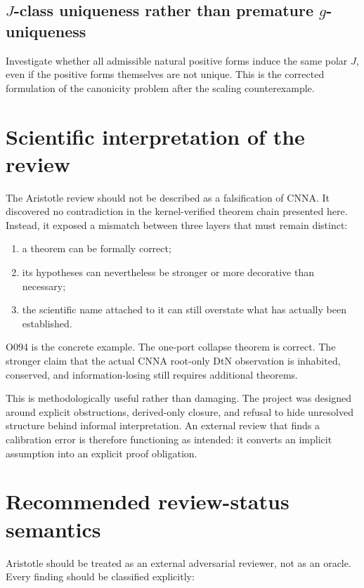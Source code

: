\documentclass[11pt,a4paper]{article}
\begin{document}
\subsection{$J$-class uniqueness rather than premature $g$-uniqueness}

Investigate whether all admissible natural positive forms induce the same polar $J$, even if the positive forms themselves are not unique. This is the corrected formulation of the canonicity problem after the scaling counterexample.

\section{Scientific interpretation of the review}

The Aristotle review should not be described as a falsification of CNNA. It discovered no contradiction in the kernel-verified theorem chain presented here. Instead, it exposed a mismatch between three layers that must remain distinct:

\begin{enumerate}
  \item a theorem can be formally correct;
  \item its hypotheses can nevertheless be stronger or more decorative than necessary;
  \item the scientific name attached to it can still overstate what has actually been established.
\end{enumerate}

O094 is the concrete example. The one-port collapse theorem is correct. The stronger claim that the actual CNNA root-only DtN observation is inhabited, conserved, and information-losing still requires additional theorems.

This is methodologically useful rather than damaging. The project was designed around explicit obstructions, derived-only closure, and refusal to hide unresolved structure behind informal interpretation. An external review that finds a calibration error is therefore functioning as intended: it converts an implicit assumption into an explicit proof obligation.

\section{Recommended review-status semantics}

Aristotle should be treated as an external adversarial reviewer, not as an oracle. Every finding should be classified explicitly:
\end{document}
